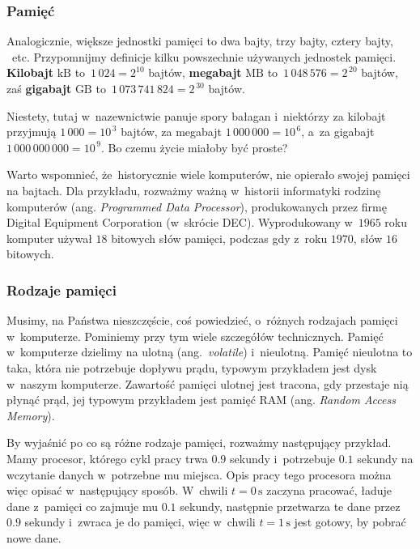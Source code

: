 \documentclass[10pt,t]{beamer}
\begin{document}
\begin{frame}
  \frametitle{Pamięć}


  Analogicznie, większe jednostki pamięci to dwa bajty, trzy
  bajty, cztery bajty, ~etc. Przypomnijmy definicje kilku powszechnie
  używanych jednostek pamięci. \textbf{Kilobajt} $\text{kB}$
  to~$1 \, 024 = 2^{ 10 }$ bajtów, \textbf{megabajt} $\text{MB}$
  to~$1 \, 048 \, 576 = 2^{ \, 20 }$ bajtów, zaś \textbf{gigabajt}
  $\text{GB}$ to~$1 \, 073 \, 741 \, 824 = 2^{ \, 30 }$ bajtów.

  Niestety, tutaj w~nazewnictwie panuje spory bałagan i~niektórzy za
  kilobajt przyjmują $1 \, 000 = 10^{ \, 3 }$ bajtów, za megabajt
  $1 \, 000 \, 000 = 10^{ \, 6 }$, a~za gigabajt
  $1 \, 000 \, 000 \, 000 = 10^{ \, 9 }$. Bo czemu życie miałoby być proste?

  Warto wspomnieć, że~historycznie wiele komputerów, nie opierało swojej
  pamięci na bajtach. Dla przykładu, rozważmy ważną w~historii informatyki
  rodzinę komputerów
  (ang. \textit{Programmed Data Processor}), produkowanych przez firmę
  {Digital Equipment Corporation} (w~skrócie DEC). Wyprodukowany w~$1965$
  roku komputer 
  używał $18$ bitowych słów pamięci, podczas gdy
   z~roku
  $1970$, słów $16$ bitowych.

\end{frame}





\begin{frame}
  \frametitle{Rodzaje pamięci}


  Musimy, na Państwa nieszczęście, coś powiedzieć, o~różnych rodzajach
  pamięci w~komputerze. Pominiemy przy tym wiele szczegółów technicznych.
  Pamięć w~komputerze dzielimy na ulotną (ang.~\textit{volatile})
  i~nieulotną. Pamięć nieulotna to taka, która nie potrzebuje dopływu prądu,
  typowym przykładem jest dysk w~naszym komputerze. Zawartość pamięci
  ulotnej jest tracona, gdy przestaje nią płynąć prąd, jej typowym
  przykładem jest pamięć RAM (ang. \textit{Random Access Memory}).

  By wyjaśnić po co są różne rodzaje pamięci, rozważmy następujący przykład.
  Mamy procesor, którego cykl pracy trwa $0.9$ sekundy i~potrzebuje
  $0.1$ sekundy na wczytanie danych w~potrzebne mu miejsca. Opis pracy tego
  procesora można więc opisać w~następujący sposób. W~chwili $t = 0 \,
  \text{s}$ zaczyna pracować, ładuje dane z~pamięci co zajmuje mu $0.1$
  sekundy, następnie przetwarza te dane przez $0.9$ sekundy i~zwraca je do
  pamięci, więc w~chwili $t = 1 \, \text{s}$ jest gotowy, by pobrać nowe
  dane.

\end{frame}
\end{document}
